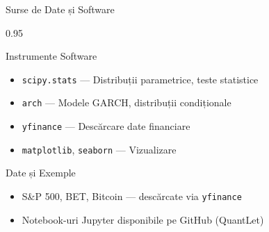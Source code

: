 \documentclass[9pt, aspectratio=169, t]{beamer}
\begin{document}
\begin{frame}{Surse de Date și Software}
    \begin{cminipage}{0.95\textwidth}
    \begin{block}{Instrumente Software}
        {\small
        \begin{itemize}\setlength{\itemsep}{0pt}
            \item \texttt{scipy.stats} --- Distribuții parametrice, teste statistice
            \item \texttt{arch} --- Modele GARCH, distribuții condiționale
            \item \texttt{yfinance} --- Descărcare date financiare
            \item \texttt{matplotlib}, \texttt{seaborn} --- Vizualizare
        \end{itemize}
        }
    \end{block}

    \vspace{0.3cm}
    \begin{block}{Date și Exemple}
        {\small
        \begin{itemize}\setlength{\itemsep}{0pt}
            \item S\&P 500, BET, Bitcoin --- descărcate via \texttt{yfinance}
            \item Notebook-uri Jupyter disponibile pe GitHub (QuantLet)
        \end{itemize}
        }
    \end{block}
    \end{cminipage}
\end{frame}
\end{document}
